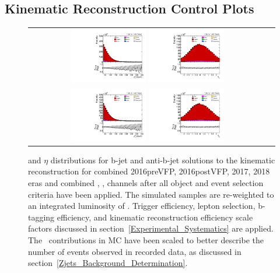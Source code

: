 \clearpage
\subsection{Kinematic Reconstruction Control Plots}

\begin{figure}[htb]
    \begin{center}
        \begin{tabular}{cc}
            \includegraphics[width=0.325\textwidth]{fig_fullRun2UL/controlplots/combined/HypBJetpT.pdf}
            \includegraphics[width=0.325\textwidth]{fig_fullRun2UL/controlplots/combined/HypBJetEta.pdf} \\
            \includegraphics[width=0.325\textwidth]{fig_fullRun2UL/controlplots/combined/HypAntiBJetpT.pdf}
            \includegraphics[width=0.325\textwidth]{fig_fullRun2UL/controlplots/combined/HypAntiBJetEta.pdf} 
        \end{tabular}
        \caption{\footnotesize \pT and $\eta$ distributions for b-jet and anti-b-jet solutions to the kinematic reconstruction for combined 2016preVFP, 2016postVFP, 2017, 2018 eras and combined \ee, \emu, \mumu channels after all object and event selection criteria have been applied.
        The simulated samples are re-weighted to an integrated luminosity of \lumivalueRuniiUL.
        Trigger efficiency, lepton selection, b-tagging efficiency, and kinematic reconstruction efficiency scale factors discussed in section~\ref{Experimental_Systematics} are applied.
        The \zjets\ contributions in MC have been scaled to better describe the number of events observed in recorded data, as discussed in section~\ref{Zjets_Background_Determination}.
        }
    \end{center}
\end{figure}

